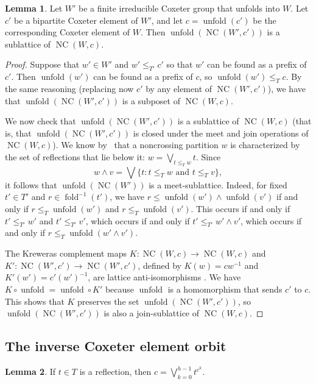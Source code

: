 \documentclass[10pt,a4paper]{amsart}
\theoremstyle{definition}
\newtheorem{lemma}[lemma]{Lemma}
\newcommand{\U}{{W'}}
\newcommand{\uu}{{w'}}
\DeclareMathOperator{\NC}{NC}
\DeclareMathOperator{\fold}{fold}
\DeclareMathOperator{\unfold}{unfold}
\begin{document}
\begin{lemma}
Let $\U$ be a finite irreducible Coxeter group that unfolds into $W$. Let $c'$ be a bipartite Coxeter element of $\U$, and let $c=\unfold(c')$ be the corresponding Coxeter element of $W$. Then $\unfold(\NC(\U,c'))$ is a sublattice of $\NC(W,c)$.
\label{lem:lattice_embedding}
\end{lemma}
\begin{proof}
Suppose that $w'\in W'$ and $w' \leq_{T'} c'$ so that $\uu$ can be found as a prefix of $c'$. Then $\unfold(\uu)$ can be found as a prefix of $c$, so $\unfold(\uu) \leq_T c$.  By the same reasoning (replacing now $c'$ by any element of $\NC(\U,c')$), we have that $\unfold(\NC(\U,c'))$ is a subposet of $\NC(W,c)$.

We now check that $\unfold(\NC(\U,c'))$ is a sublattice of $\NC(W,c)$ (that is, that $\unfold(\NC(\U,c'))$ is closed under the meet and join operations of $\NC(W,c)$).  We know by~\cite{brady2008non} that a noncrossing partition $w$ is characterized by the set of reflections that lie below it: $w = \bigvee_{t \leq_T w} t$. Since 
\[
w \wedge v = \bigvee\{t : t \leq_T w \text{ and } t \leq_T v\},
\]
 it follows that $\unfold(\NC(\U))$ is a meet-sublattice. Indeed, for fixed $t'\in T'$ and $r \in \fold^{-1}(t')$, we have $r \leq \unfold(w') \wedge \unfold(v')$ if and only if $r \leq_T \unfold(w')$ and $r \leq_T \unfold(v')$. This occurs if and only if $t' \leq_{T'} w'$ and $t' \leq_{T'} v'$, which occurs if and only if $t' \leq_{T'} w' \wedge v'$, which occurs if and only if $r \leq_T \unfold(w' \wedge v')$. 


The Kreweras complement maps $K:\NC(W,c)\to \NC(W,c)$ and $K':\NC(W',c')\to \NC(W',c')$, defined by $K(w)= cw^{-1}$ and $K'(w')=c'(w')^{-1}$, are lattice anti-isomorphisms \cite{armstrong2009generalized}. We have $K\circ\unfold=\unfold\circ K'$ because $\unfold$ is a homomorphism that sends $c'$ to $c$. This shows that $K$ preserves the set $\unfold(\NC(\U,c'))$, so $\unfold(\NC(\U,c'))$ is also a join-sublattice of $\NC(W,c)$.
\end{proof}

\setcounter{subsection}{3}
\subsection{The inverse Coxeter element orbit}
\label{sec:inverse_c_orbit}

\setcounter{theorem}{11}
\begin{lemma}\label{Lem:joinofcorbit}
If $t\in T$ is a reflection, then $c=\bigvee\limits_{k=0}^{h-1} t^{c^{k}}$.
\end{lemma}
\end{document}
